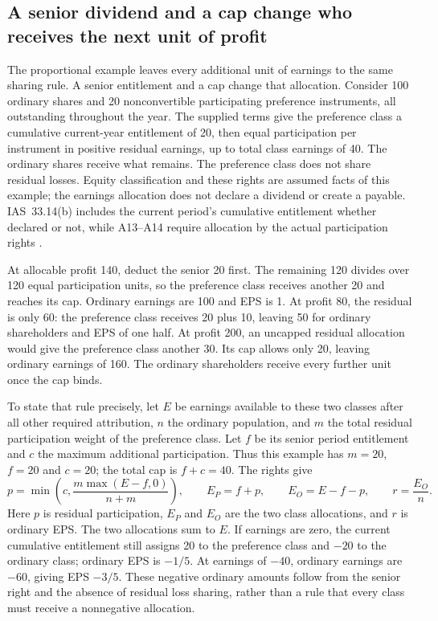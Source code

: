 \subsection{A senior dividend and a cap change who receives the next unit of profit}
\label{capped-participation-eps}

The proportional example leaves every additional unit of earnings to the same
sharing rule. A senior entitlement and a cap change that allocation. Consider
100 ordinary shares and 20 nonconvertible participating preference instruments,
all outstanding throughout the year. The supplied terms give the preference
class a cumulative current-year entitlement of 20, then equal participation
per instrument in positive residual earnings, up to total class earnings of
40. The ordinary shares receive what remains. The preference class does not
share residual losses. Equity classification and these rights are assumed
facts of this example; the earnings allocation does not declare a dividend or
create a payable. IAS~33.14(b) includes the current period's cumulative
entitlement whether declared or not, while A13--A14 require allocation by the
actual participation rights \citep[IAS~33.14(b), A13--A14]{eu20231803}.

At allocable profit 140, deduct the senior 20 first. The remaining 120 divides
over 120 equal participation units, so the preference class receives another
20 and reaches its cap. Ordinary earnings are 100 and EPS is 1. At profit 80,
the residual is only 60: the preference class receives 20 plus 10, leaving
50 for ordinary shareholders and EPS of one half. At profit 200, an uncapped
residual allocation would give the preference class another 30. Its cap allows
only 20, leaving ordinary earnings of 160. The ordinary shareholders receive
every further unit once the cap binds.

To state that rule precisely, let \(E\) be earnings available to these two
classes after all other required attribution, \(n\) the ordinary population,
and \(m\) the total residual participation weight of the preference class.
Let \(f\) be its senior period entitlement and \(c\) the maximum additional
participation. Thus this example has \(m=20\), \(f=20\) and \(c=20\);
the total cap is \(f+c=40\). The rights give
\[
 p=\min\!\left(c,\frac{m\max(E-f,0)}{n+m}\right),\qquad
 E_P=f+p,\qquad E_O=E-f-p,\qquad r=\frac{E_O}{n}.
\]
Here \(p\) is residual participation, \(E_P\) and \(E_O\) are the two
class allocations, and \(r\) is ordinary EPS. The two allocations sum to
\(E\). If earnings are zero, the current cumulative entitlement still assigns
20 to the preference class and \(-20\) to the ordinary class; ordinary EPS
is \(-1/5\). At earnings of \(-40\), ordinary earnings are \(-60\), giving
EPS \(-3/5\). These negative ordinary amounts follow from the senior right
and the absence of residual loss sharing, rather than a rule that every class
must receive a nonnegative allocation.

